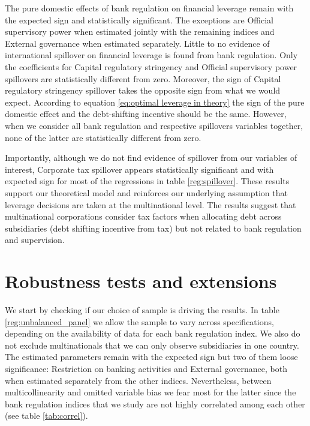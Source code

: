 \documentclass[12pt]{article}
\begin{document}
 The pure domestic effects of bank regulation on financial leverage remain with the expected sign and statistically significant. The exceptions are Official supervisory power when estimated jointly with the remaining indices and External governance when estimated separately.  Little to no evidence of international spillover on financial leverage is found from bank regulation. Only the coefficients for Capital regulatory stringency and Official supervisory power spillovers are statistically different from zero. Moreover, the sign of Capital regulatory stringency spillover takes the opposite sign from what we would expect. According to equation \ref{eq:optimal leverage in theory} the sign of the pure domestic effect and the debt-shifting incentive should be the same. However, when we consider all bank regulation and respective spillovers variables together, none of the latter are statistically different from zero.       
 
 
 
 Importantly, although we do not find evidence of spillover from our variables of interest, Corporate tax spillover appears statistically significant and with expected sign for most of the regressions in table \ref{reg:spillover}. These results support our theoretical model and reinforces our underlying assumption that leverage decisions are taken at the multinational level. The results suggest that multinational corporations consider tax factors when allocating debt across subsidiaries (debt shifting incentive from tax) but not related to bank regulation and supervision.
			  
	\section{Robustness tests and extensions} \label{sec:robustness}
	We start by checking if our choice of sample is driving the results. In table \ref{reg:unbalanced_panel} we allow the sample to vary across specifications, depending on the availability of data for each bank regulation index. We also do not exclude multinationals that we can only observe subsidiaries in one country. The estimated parameters remain with the expected sign but two of them loose significance: Restriction on banking activities and External governance, both when estimated separately from the other indices. Nevertheless, between multicollinearity and omitted variable bias we fear most for the latter since the bank regulation indices that we study are not highly correlated among each other (see table \ref{tab:correl}).  
	
\end{document}

